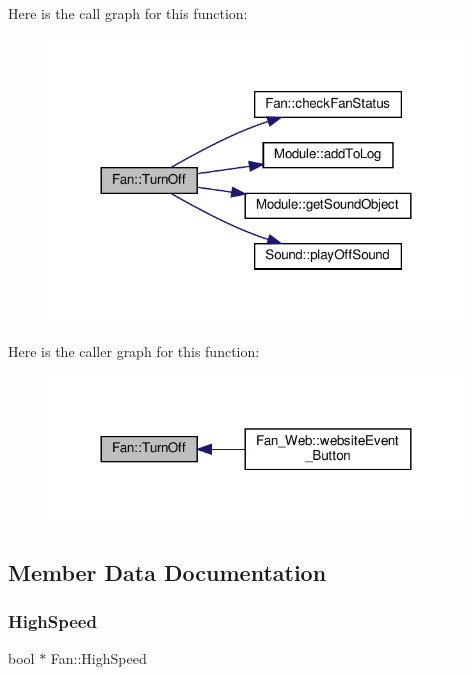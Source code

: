 Here is the call graph for this function\+:
\nopagebreak
\begin{figure}[H]
\begin{center}
\leavevmode
\includegraphics[width=312pt]{class_fan_af5a22c8800d5a4f3295f44a313af71d2_cgraph}
\end{center}
\end{figure}
Here is the caller graph for this function\+:
\nopagebreak
\begin{figure}[H]
\begin{center}
\leavevmode
\includegraphics[width=312pt]{class_fan_af5a22c8800d5a4f3295f44a313af71d2_icgraph}
\end{center}
\end{figure}


\subsection{Member Data Documentation}
\mbox{\label{class_fan_ac2c512f092cf8f435c1bdbb4278ccebe}} 
\subsubsection{\texorpdfstring{High\+Speed}{HighSpeed}}
{\footnotesize\ttfamily bool $\ast$ Fan\+::\+High\+Speed\hspace{0.3cm}{\ttfamily [protected]}}




